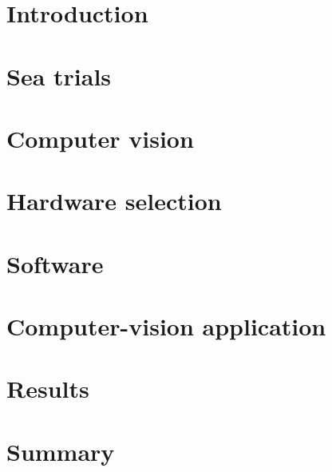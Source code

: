 
\chapter{Introduction}\label{chapter:introduction}


\chapter{Sea trials}\label{chapter:method}


\chapter{Computer vision}\label{chapter:method-vision}


\chapter{Hardware selection}\label{chapter:hardware}


\chapter{Software}\label{chapter:software}


\chapter{Computer-vision application}\label{chapter:application}


\chapter{Results}\label{chapter:results}


\chapter{Summary}\label{chapter:summary}


